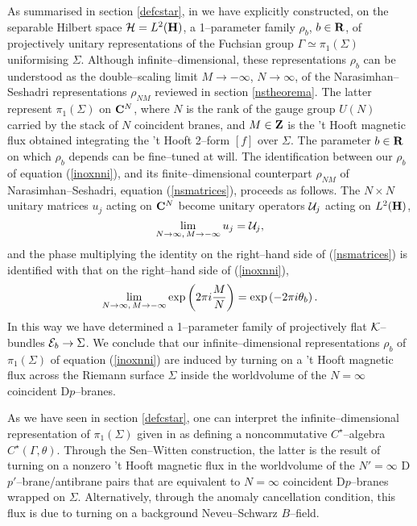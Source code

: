 \documentclass[a4paper,a4paper]{article}
\begin{document}
As summarised in section \ref{defcstar}, in \cite{PROCEEDINGS} we have 
explicitly constructed, on the separable  Hilbert space ${\cal H}=L^2({\bf H})$, 
a 1--parameter family  $\rho_b$, $b\in {\bf R}$, of projectively unitary representations 
of the Fuchsian group $\Gamma\simeq\pi_1(\Sigma)$ uniformising $\Sigma$.
Although infinite--dimensional, these representations $\rho_b$ can be understood 
as the double--scaling limit $M\rightarrow -\infty$,  $N\rightarrow\infty$, 
of the Narasimhan--Seshadri representations $\rho_{NM}$ reviewed in section \ref{nstheorema}. 
The latter represent $\pi_1(\Sigma)$ on ${\bf C}^N$, where $N$ is the rank 
of the gauge group $U(N)$ carried by the stack of $N$ coincident branes, 
and $M\in{\bf Z}$ is the 't Hooft magnetic flux obtained integrating 
the 't Hooft 2--form $[f]$ over $\Sigma$. The parameter $b\in{\bf R}$ 
on which $\rho_b$ depends can be fine--tuned at will. The identification between  
our $\rho_b$ of equation (\ref{inoxnni}), and its finite--dimensional counterpart 
$\rho_{NM}$ of Narasimhan--Seshadri,  equation (\ref{nsmatrices}), 
proceeds as follows. The $N\times N$ unitary matrices $u_j$ acting 
on ${\bf C}^N$ become unitary operators ${\cal U}_j$ acting on $L^2({\bf H})$,
\begin{equation}  
\lim_{N\to\infty,\,M\to -\infty}u_j={\cal U}_j,
\label{identification}
\end{equation} 
and the phase multiplying the identity on the right--hand side of 
(\ref{nsmatrices})
is identified with that on the right--hand side of (\ref{inoxnni}),
\begin{equation}
\lim_{N\to\infty,\,M\to -\infty}
\exp \left(2\pi i {M\over N}\right)=
\exp \left(-2\pi i \theta_b\right).  
\label{identificationx}
\end{equation} 
In this way we have determined a 1--parameter family of projectively flat 
${\cal K}$--bundles ${\cal E}_b\rightarrow\Sigma$. We conclude that   
our infinite--dimensional representations $\rho_b$ of $\pi_1(\Sigma)$
of equation (\ref{inoxnni}) are induced by turning on a 't Hooft magnetic 
flux across the Riemann surface $\Sigma$ inside the worldvolume of the 
$N=\infty$ coincident D$p$--branes. 

As we have seen in section \ref{defcstar}, one can interpret the infinite--dimensional 
representation of $\pi_1(\Sigma)$ given in \cite{PROCEEDINGS} as defining a
noncommutative $C^{\star}$--algebra $C^{\star}(\Gamma, \theta)$. Through the 
Sen--Witten construction, the latter is the result of turning on a nonzero 't Hooft 
magnetic flux in the worldvolume of the $N'=\infty$ D$p'$--brane/antibrane pairs 
that are equivalent to $N=\infty$ coincident D$p$--branes wrapped on $\Sigma$. 
Alternatively, through the anomaly cancellation condition, this flux is due to 
turning on a background Neveu--Schwarz $B$--field.  
\end{document}
